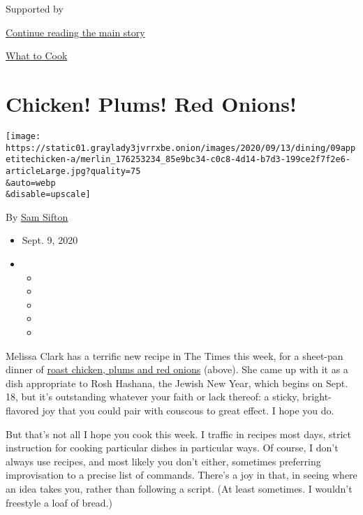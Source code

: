 Supported by

\protect\hyperlink{after-sponsor}{Continue reading the main story}

\href{/column/what-to-cook}{What to Cook}

\hypertarget{chicken-plums-red-onions}{%
\section{Chicken! Plums! Red Onions!}\label{chicken-plums-red-onions}}

\texttt{[image: https://static01.graylady3jvrrxbe.onion/images/2020/09/13/dining/09appetitechicken-a/merlin\_176253234\_85e9bc34-c0c8-4d14-b7d3-199ce2f7f2e6-articleLarge.jpg?quality=75\\\&auto=webp\\\&disable=upscale]}

By \href{https://www.nytimes3xbfgragh.onion/by/sam-sifton}{Sam Sifton}

\begin{itemize}
\item
  Sept. 9, 2020
\item
  \begin{itemize}
  \item
  \item
  \item
  \item
  \item
  \end{itemize}
\end{itemize}

Melissa Clark has a terrific new recipe in The Times this week, for a
sheet-pan dinner of
\href{https://cooking.nytimes3xbfgragh.onion/recipes/1021408-sheet-pan-chicken-with-roasted-plums-and-onions}{roast
chicken, plums and red onions} (above). She came up with it as a dish
appropriate to Rosh Hashana, the Jewish New Year, which begins on Sept.
18, but it's outstanding whatever your faith or lack thereof: a sticky,
bright-flavored joy that you could pair with couscous to great effect. I
hope you do.

But that's not all I hope you cook this week. I traffic in recipes most
days, strict instruction for cooking particular dishes in particular
ways. Of course, I don't always use recipes, and most likely you don't
either, sometimes preferring improvisation to a precise list of
commands. There's a joy in that, in seeing where an idea takes you,
rather than following a script. (At least sometimes. I wouldn't
freestyle a loaf of bread.)

